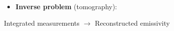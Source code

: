 \documentclass[10pt]{beamer}
\begin{document}
\begin{frame}
\begin{columns}
\begin{column}{0.675\textwidth}
\begin{center}
   	\begin{block}{}
	\begin{itemize}
	\item \textcolor{myblue}{\textbf{Inverse problem} (tomography):\\
	}
	\end{itemize}
	\end{block}
Integrated measurements $\longrightarrow$ Reconstructed emissivity \\

   	\end{center}
	
   	\end{column}
%    	
\end{columns}


\end{frame}
\end{document}
